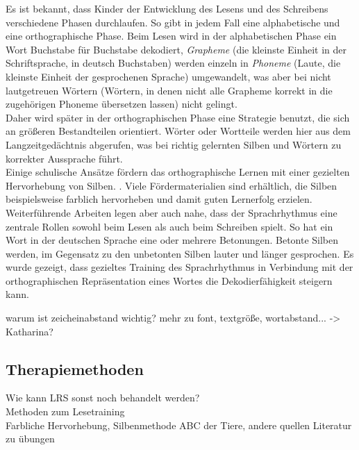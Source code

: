 Es ist bekannt, dass Kinder der Entwicklung des Lesens und des Schreibens verschiedene Phasen durchlaufen.  So gibt in jedem Fall eine alphabetische und eine orthographische Phase. Beim Lesen wird in der alphabetischen Phase ein Wort Buchstabe für Buchstabe dekodiert, \textit{Grapheme} (die kleinste Einheit in der Schriftsprache, in deutsch Buchstaben) werden einzeln in \textit{Phoneme} (Laute, die kleinste Einheit der gesprochenen Sprache) umgewandelt, was aber bei nicht lautgetreuen Wörtern (Wörtern, in denen nicht alle Grapheme korrekt in die zugehörigen Phoneme übersetzen lassen) nicht gelingt.\\
Daher wird später in der orthographischen Phase eine Strategie benutzt, die sich an größeren Bestandteilen orientiert. Wörter oder Wortteile werden hier aus dem Langzeitgedächtnis abgerufen, was bei richtig gelernten Silben und Wörtern zu korrekter Aussprache führt. \cite{Steinbrink2014}\\
Einige schulische Ansätze fördern das orthographische Lernen mit einer gezielten Hervorhebung von Silben. .  Viele Fördermaterialien sind erhältlich, die Silben beispielsweise farblich hervorheben und damit guten Lernerfolg erzielen. 
Weiterführende Arbeiten legen aber auch nahe, dass der Sprachrhythmus eine zentrale Rollen sowohl beim Lesen als auch beim Schreiben spielt. So hat ein Wort in der deutschen Sprache eine oder mehrere Betonungen. Betonte Silben werden, im Gegensatz zu den unbetonten Silben lauter und länger gesprochen. Es wurde gezeigt, dass gezieltes Training des Sprachrhythmus in Verbindung mit der orthographischen Repräsentation eines Wortes die Dekodierfähigkeit steigern kann. \cite{Brandelik2014}

warum ist zeicheinabstand wichtig? mehr zu font, textgröße, wortabstand... -> Katharina?

\subsection{Therapiemethoden}

Wie kann LRS sonst noch behandelt werden?\\
Methoden zum Lesetraining\\
Farbliche Hervorhebung, Silbenmethode ABC der Tiere, andere quellen
Literatur zu übungen\\

